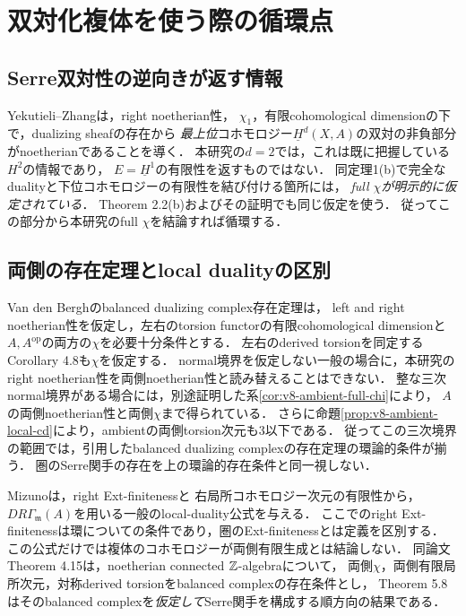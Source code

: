 \documentclass[11pt,a4paper]{ltjsarticle}
\begin{document}
\section{双対化複体を使う際の循環点}\label{sec:duality-gap}
\subsection{Serre双対性の逆向きが返す情報}
Yekutieli--Zhang\cite[Theorem 2.3(2), p.~702]{YZ}は，right noetherian性，
$\chi_1$，有限cohomological dimensionの下で，dualizing sheafの存在から
\emph{最上位}コホモロジー$\underline H^d(X,A)$の双対の非負部分がnoetherianであることを導く．
本研究の$d=2$では，これは既に把握している$H^2$の情報であり，
$E=\underline H^1$の有限性を返すものではない．
同定理1(b)で完全なdualityと下位コホモロジーの有限性を結び付ける箇所には，
\emph{full $\chi$が明示的に仮定されている}．
Theorem 2.2(b)およびその証明でも同じ仮定を使う．
従ってこの部分から本研究のfull $\chi$を結論すれば循環する．

\subsection{両側の存在定理とlocal dualityの区別}
Van den Bergh\cite[Theorem 6.3, 著者版pp.~7--8]{VdBdual}のbalanced dualizing complex存在定理は，
left and right noetherian性を仮定し，左右のtorsion functorの有限cohomological dimensionと
$A,A^{\mathrm{op}}$の両方の$\chi$を必要十分条件とする．
左右のderived torsionを同定するCorollary 4.8も$\chi$を仮定する．
normal境界を仮定しない一般の場合に，本研究のright noetherian性を両側noetherian性と読み替えることはできない．
整な三次normal境界がある場合には，別途証明した系\ref{cor:v8-ambient-full-chi}により，
$A$の両側noetherian性と両側$\chi$まで得られている．
さらに命題\ref{prop:v8-ambient-local-cd}により，ambientの両側torsion次元も3以下である．
従ってこの三次境界の範囲では，引用したbalanced dualizing complexの存在定理の環論的条件が揃う．
圏のSerre関手の存在を上の環論的存在条件と同一視しない．

Mizuno\cite[Theorem 3.21, Corollary 3.23]{Mizuno}は，right Ext-finitenessと
右局所コホモロジー次元の有限性から，$D R\Gamma_{\mathfrak m}(A)$を用いる一般のlocal-duality公式を与える．
ここでのright Ext-finitenessは環についての条件であり，圏のExt-finitenessとは定義を区別する．
この公式だけでは複体のコホモロジーが両側有限生成とは結論しない．
同論文Theorem 4.15は，noetherian connected $\mathbb Z$-algebraについて，
両側$\chi$，両側有限局所次元，対称derived torsionをbalanced complexの存在条件とし，
Theorem 5.8はそのbalanced complexを\emph{仮定して}Serre関手を構成する順方向の結果である．
\end{document}
